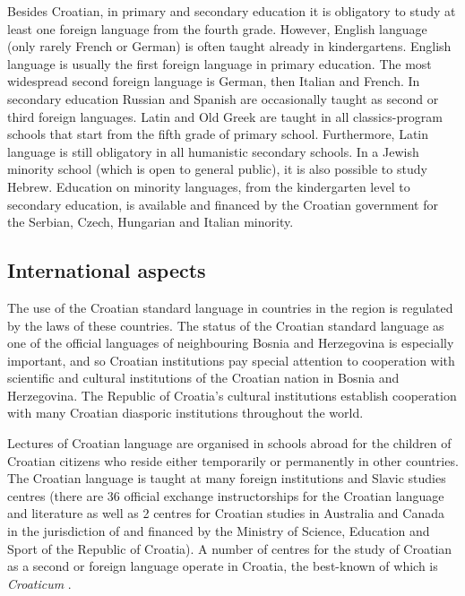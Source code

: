 \begin{multicols}{2}
Besides Croatian, in primary and secondary education it is obligatory to study at least one foreign language from the fourth grade. However, English language (only rarely French or German) is often taught already in kindergartens. English language is usually the first foreign language in primary education. The most widespread second foreign language is German, then Italian and French. In secondary education Russian and Spanish are occasionally taught as second or third foreign languages. Latin and Old Greek are taught in all classics-program schools that start from the fifth grade of primary school. Furthermore, Latin language is still obligatory in all humanistic secondary schools. In a Jewish minority school (which is open to general public), it is also possible to study Hebrew. Education on minority languages, from the kindergarten level to secondary education, is available and financed by the Croatian government for the Serbian, Czech, Hungarian and Italian minority.

\subsection{International aspects}

The use of the Croatian standard language in countries in the region is regulated by the laws of these countries. The status of the Croatian standard language as one of the official languages of neighbouring Bosnia and Herzegovina is especially important, and so Croatian institutions pay special attention to cooperation with scientific and cultural institutions of the Croatian nation in Bosnia and Herzegovina. The Republic of Croatia’s cultural institutions establish cooperation with many Croatian diasporic institutions throughout the world. 


Lectures of Croatian language are organised in schools abroad for the children of Croatian citizens who reside either temporarily or permanently in other countries. The Croatian language is taught at many foreign institutions and Slavic studies centres (there are 36 official exchange instructorships for the Croatian language and literature as well as 2 centres for Croatian studies in Australia and Canada in the jurisdiction of and financed by the Ministry of Science, Education and Sport of the Republic of Croatia). A number of centres for the study of Croatian as a second or foreign language operate in Croatia, the best-known of which is \emph{Croaticum} \cite{str10}. 


\end{multicols}

